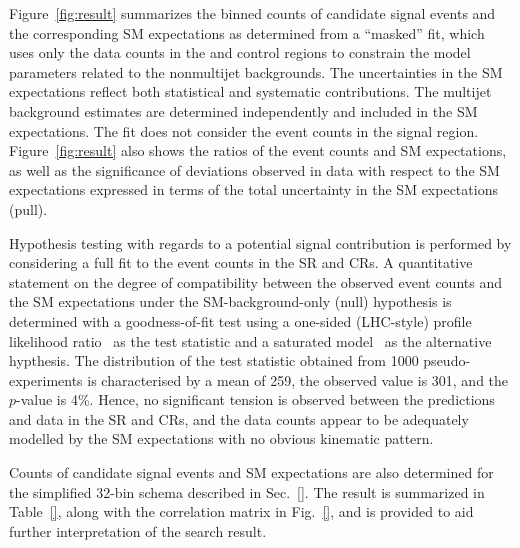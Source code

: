 Figure~\ref{fig:result} summarizes the binned counts of candidate
signal events and the corresponding SM expectations as determined from
a ``masked'' fit, which uses only the data counts in the \mj and \mmj
control regions to constrain the model parameters related to the
nonmultijet backgrounds. The uncertainties in the SM expectations
reflect both statistical and systematic contributions. The multijet
background estimates are determined independently and included in the
SM expectations. The fit does not consider the event counts in the
signal region. Figure~\ref{fig:result} also shows the ratios of the
event counts and SM expectations, as well as the significance of
deviations observed in data with respect to the SM expectations
expressed in terms of the total uncertainty in the SM expectations
(pull). 

Hypothesis testing with regards to a potential signal contribution is
performed by considering a full fit to the event counts in the SR and
CRs. A quantitative statement on the degree of compatibility between
the observed event counts and the SM expectations under the
SM-background-only (null) hypothesis is determined with a
goodness-of-fit test using a one-sided (LHC-style) profile likelihood
ratio~\cite{CMS-NOTE-2011-005} as the test statistic and a saturated
model~\cite{sat-llk} as the alternative hypthesis. The distribution of
the test statistic obtained from 1000 pseudo-experiments is
characterised by a mean of 259, the observed value is 301, and the
$p$-value is 4\%. Hence, no significant tension is observed between
the predictions and data in the SR and CRs, and the data counts appear
to be adequately modelled by the SM expectations with no obvious
kinematic pattern.

Counts of candidate signal events and SM expectations are also
determined for the simplified 32-bin schema described in
Sec.~\ref{}. The result is summarized in Table~\ref{}, along with the
correlation matrix in Fig.~\ref{}, and is provided to aid
further interpretation of the search result. 

